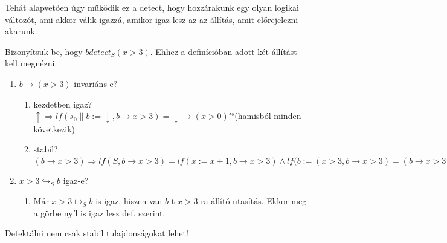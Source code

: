 \documentclass{article}
\newcommand{\false}{\downarrow}
\newcommand{\true}{\uparrow}
\newcommand{\pp}{\parallel}
\begin{document}
Tehát alapvetően úgy működik ez a detect, hogy hozzárakunk egy olyan logikai változót, ami akkor válik igazzá, amikor igaz lesz az az állítás, amit előrejelezni akarunk.

Bizonyítsuk be, hogy $b detect_S (x > 3)$. Ehhez a definícióban adott két állítást kell megnézni.

\begin{enumerate}
\item[1)] $b \rightarrow (x >3)$ invariáns-e?
\begin{enumerate}
\item[a)] kezdetben igaz?\\
$\true \Rightarrow lf(s_0 \pp b:=\false, b \rightarrow x>3) = \false \rightarrow (x >0)^{s_0}$\checkmark (hamisból minden következik)
\item[b)]stabil?\\
$(b \rightarrow x > 3) \Rightarrow lf(S, b \rightarrow x > 3) = lf(x := x+1, b \rightarrow x >3) \land lf(b:=(x>3,b \rightarrow x >3) = (b \rightarrow x >3)^{x\leftarrow x+1} \land (b \rightarrow x>3)^{b \leftarrow b>3}=(\neg b \lor x+1 > 3) \land (x >3 \rightarrow x>3)$ \checkmark
\end{enumerate}
\item[2)] $x>3 \hookrightarrow_S b$ igaz-e?
\begin{enumerate}
\item[a)] Már $x>3 \mapsto_S b$ is igaz, hiszen van $b$-t $x>3$-ra állító utasítás. Ekkor meg a görbe nyíl is igaz lesz def. szerint.
\end{enumerate}
\end{enumerate}
Detektálni nem csak stabil tulajdonságokat lehet!
\end{document}
